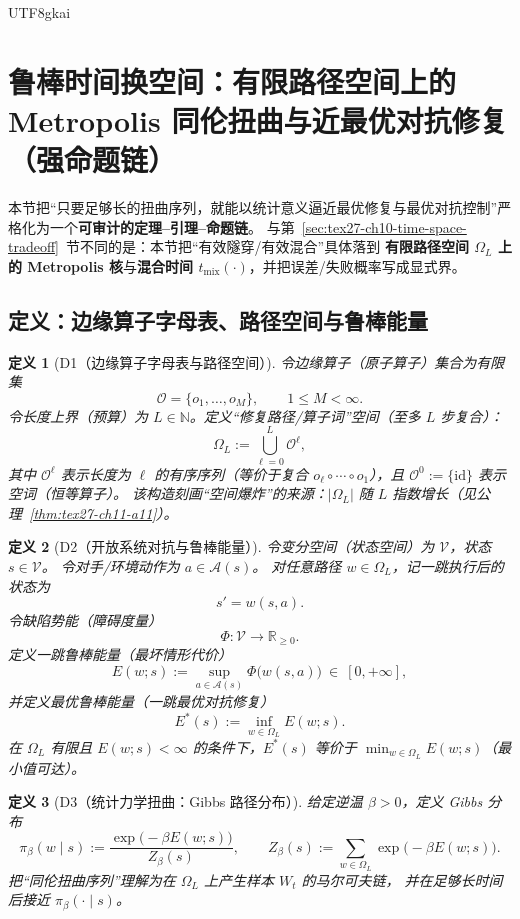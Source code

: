 \documentclass[12pt]{article}
\newtheorem{definition}{定义}[section]
\newcommand{\RR}{\mathbb{R}}
\newcommand{\NN}{\mathbb{N}}
\begin{document}
\begin{CJK*}{UTF8}{gkai}
\section{鲁棒时间换空间：有限路径空间上的 Metropolis 同伦扭曲与近最优对抗修复（强命题链）}
\label{sec:tex27-ch11-robust-time-space}

本节把“只要足够长的扭曲序列，就能以统计意义逼近最优修复与最优对抗控制”严格化为一个\textbf{可审计的定理--引理--命题链}。
与第~\ref{sec:tex27-ch10-time-space-tradeoff}~节不同的是：本节把“有效隧穿/有效混合”具体落到
\textbf{有限路径空间 $\Omega_L$ 上的 Metropolis 核}与\textbf{混合时间 $t_{\mathrm{mix}}(\cdot)$}，并把误差/失败概率写成显式界。

\subsection{定义：边缘算子字母表、路径空间与鲁棒能量}
\label{subsec:tex27-ch11-defs}

\begin{definition}[D1（边缘算子字母表与路径空间）]
\label{def:tex27-ch11-d1}
令边缘算子（原子算子）集合为有限集
\[
  \mathcal{O}=\{o_1,\dots,o_M\},
  \qquad
  1\le M<\infty.
\]
令长度上界（预算）为 $L\in\NN$。定义“修复路径/算子词”空间（至多 $L$ 步复合）：
\[
  \Omega_L:=\bigcup_{\ell=0}^{L}\mathcal{O}^{\ell},
\]
其中 $\mathcal{O}^{\ell}$ 表示长度为 $\ell$ 的有序序列（等价于复合 $o_{\ell}\circ\cdots\circ o_1$），且 $\mathcal{O}^0:=\{\mathrm{id}\}$
  表示空词（恒等算子）。
该构造刻画“空间爆炸”的来源：$|\Omega_L|$ 随 $L$ 指数增长（见公理~\ref{thm:tex27-ch11-a11}）。
\end{definition}

\begin{definition}[D2（开放系统对抗与鲁棒能量）]
\label{def:tex27-ch11-d2}
令变分空间（状态空间）为 $\mathcal{V}$，状态 $s\in\mathcal{V}$。
令对手/环境动作为 $a\in\mathcal{A}(s)$。
对任意路径 $w\in\Omega_L$，记一跳执行后的状态为
\[
  s' = w(s,a).
\]
令缺陷势能（障碍度量）
\[
  \Phi:\mathcal{V}\to\RR_{\ge 0}.
\]
定义一跳鲁棒能量（最坏情形代价）
\[
  E(w;s):=\sup_{a\in\mathcal{A}(s)}\Phi\bigl(w(s,a)\bigr)\ \in\ [0,+\infty],
\]
并定义最优鲁棒能量（一跳最优对抗修复）
\[
  E^\ast(s):=\inf_{w\in\Omega_L}E(w;s).
\]
在 $\Omega_L$ 有限且 $E(w;s)<\infty$ 的条件下，$E^\ast(s)$ 等价于 $\min_{w\in\Omega_L}E(w;s)$（最小值可达）。
\end{definition}

\begin{definition}[D3（统计力学扭曲：Gibbs 路径分布）]
\label{def:tex27-ch11-d3}
给定逆温 $\beta>0$，定义 Gibbs 分布
\[
  \pi_\beta(w\mid s):=\frac{\exp\bigl(-\beta E(w;s)\bigr)}{Z_\beta(s)},
  \qquad
  Z_\beta(s):=\sum_{w\in\Omega_L}\exp\bigl(-\beta E(w;s)\bigr).
\]
把“同伦扭曲序列”理解为在 $\Omega_L$ 上产生样本 $W_t$ 的马尔可夫链，
并在足够长时间后接近 $\pi_\beta(\cdot\mid s)$。
\end{definition}


\end{CJK*}
\end{document}
